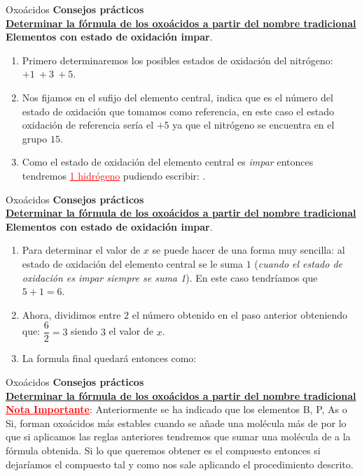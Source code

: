 \documentclass{beamer}
\newcommand*{\numberballmDarkTeal}{\protect\cnumero{\arabic*}{mDarkTeal}}
\newcommand{\examplebeamer}[1]{{\color{mLightGreen}\textbf{#1}}}
\newcommand{\alertbeamer}[1]{\alert{\textbf{#1}}}
\newcommand{\blockbeamer}[1]{{\color{mDarkTeal}\textbf{#1}}}
\newcommand{\nline}[1][6pt]{\\[#1]}
\begin{document}
\begin{frame}[t]{Oxoácidos}
    \alertbeamer{\Large Consejos prácticos}\nline{}
    \examplebeamer{\uline{Determinar la fórmula de los oxoácidos a partir del nombre tradicional}}\nline{}
    \blockbeamer{Elementos con estado de oxidación impar}. 
    \begin{enumerate}[label=\numberballmDarkTeal]
        \item Primero determinaremos los posibles estados de oxidación del nitrógeno: $+1\ +3\ +5$.
        \item Nos fijamos en el sufijo del elemento central,  indica que es el número del estado de oxidación que tomamos como referencia, en este caso el estado oxidación de referencia sería el $+5$ ya que el nitrógeno se encuentra en el grupo $15$.
        \item Como el estado de oxidación del elemento central es \textit{impar} entonces tendremos \textcolor{red}{\uline{1 hidrógeno}} pudiendo escribir: \alert{}.
    \end{enumerate}
\end{frame}

\begin{frame}[t]{Oxoácidos}
    \alertbeamer{\Large Consejos prácticos}\nline{}
    \examplebeamer{\uline{Determinar la fórmula de los oxoácidos a partir del nombre tradicional}}\nline{}
    \blockbeamer{Elementos con estado de oxidación impar}. 
    \begin{enumerate}[label=\numberballmDarkTeal]
        \addtocounter{enumi}{3}
        \item Para determinar el valor de $x$ se puede hacer de una forma muy sencilla: al estado de oxidación del elemento central se le suma $1$ (\textit{cuando el estado de oxidación es impar siempre se suma 1}). En este caso tendríamos que $5 + 1 = 6$.
        \item Ahora, dividimos entre $2$ el número obtenido en el paso anterior obteniendo que:
              \(\dfrac{6}{2} = 3\) siendo $3$ el valor de $x$.
        \item La formula final quedará entonces como: 
    \end{enumerate}
\end{frame}

\begin{frame}[c]{Oxoácidos}
    \alertbeamer{\Large Consejos prácticos}\nline{}
    \examplebeamer{\uline{Determinar la fórmula de los oxoácidos a partir del nombre tradicional}}\nline{}
    \textbf{\textcolor{red}{\uline{Nota Importante}}}: Anteriormente se ha indicado que los elementos B, P, As o Si, forman oxoácidos más estables cuando se añade una molécula más de  por lo que si aplicamos las reglas anteriores tendremos que sumar una molécula de  a la fórmula obtenida. Si lo que queremos obtener es el compuesto  entonces si dejaríamos el compuesto tal y como nos sale aplicando el procedimiento descrito.
\end{frame}
\end{document}
